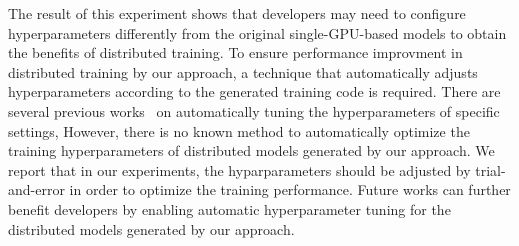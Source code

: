 \begin{inred}
The result of this experiment shows that developers may need to configure
hyperparameters differently from the original single-GPU-based models to
obtain the benefits of distributed training.
To ensure performance improvment in distributed training by our approach,
a technique that automatically adjusts hyperparameters according to the generated
training code is required.
There are several previous works~\cite{pmlr-v33-yogatama14}\cite{autohyper-rl}\cite{autotune}
on automatically tuning the hyperparameters of specific settings,
However, there is no known method to automatically optimize the training hyperparameters
of distributed models generated by our approach.
We report that in our experiments, the hyparparameters should be adjusted
by trial-and-error in order to optimize the training performance.
Future works can further benefit developers by enabling automatic
hyperparameter tuning for the distributed models generated by our approach.
\end{inred}



